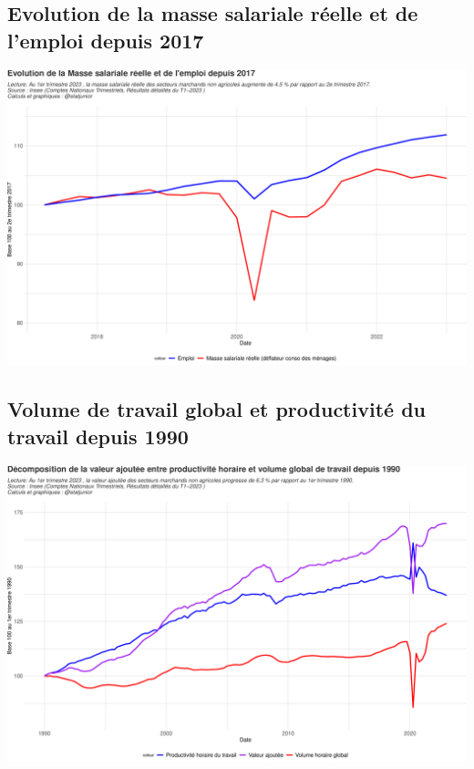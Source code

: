 \documentclass[
  paper=a4,
  ,captions=tableheading
]{scrartcl}
\begin{document}
\hypertarget{evolution-de-la-masse-salariale-ruxe9elle-et-de-lemploi-depuis-2017}{%
\subsection{Evolution de la masse salariale réelle et de l'emploi depuis
2017}\label{evolution-de-la-masse-salariale-ruxe9elle-et-de-lemploi-depuis-2017}}

\includegraphics{rapport_pdf_compte_branche_files/figure-latex/unnamed-chunk-20-1.pdf}

\hypertarget{volume-de-travail-global-et-productivituxe9-du-travail-depuis-1990}{%
\subsection{Volume de travail global et productivité du travail depuis
1990}\label{volume-de-travail-global-et-productivituxe9-du-travail-depuis-1990}}

\includegraphics{rapport_pdf_compte_branche_files/figure-latex/unnamed-chunk-21-1.pdf}
\end{document}
